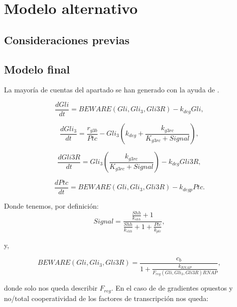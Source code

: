 \chapter{Modelo alternativo}

\label{ch:modelo_alternativo}

\section{Consideraciones previas}


\section{Modelo final}

La mayoría de cuentas del apartado se han generado con la ayuda de \cite{sympy}.

\begin{equation}
\frac{dGli}{dt} = BEWARE(Gli, Gli_3, Gli3R)-k_{deg}Gli,
\label{eq:1}
\end{equation}

\begin{equation}
\frac{dGli_3}{dt} = \frac{r_{g3b}}{Ptc}-Gli_3\left(k_{deg}+\frac{k_{g3rc}}{K_{g3rc}+Signal}\right),
\label{eq:2}
\end{equation}

\begin{equation}
\frac{dGli3R}{dt}= Gli_3\left(\frac{k_{g3rc}}{K_{g3rc}+Signal}\right)-k_{deg}Gli3R,
\label{eq:3}
\end{equation}

\begin{equation}
\frac{dPtc}{dt} = BEWARE(Gli, Gli_3, Gli3R)-k_{degp}Ptc.
\label{eq:4}
\end{equation}


Donde tenemos, por definición:
 \begin{equation}
Signal=\frac{\frac{Shh}{k_{shh}} + 1}{\frac{Shh}{k_{shh}} + 1 + \frac{Ptc}{k_{ptc}}},
\label{signal} \end{equation}

y,


\begin{equation}
BEWARE(Gli, Gli_3, Gli3R)=\frac{c_{b}}{1 + \frac{k_{RNAP}}{F_{reg}(Gli, Gli_3, Gli3R) RNAP}},
\end{equation}

donde solo nos queda describir $F_{reg}$. En el caso de de gradientes opuestos y no/total cooperatividad de los factores de transcripción nos queda:

